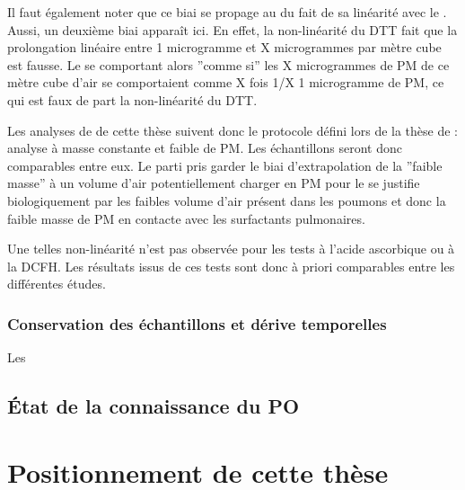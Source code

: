 Il faut également noter que ce biai se propage au \PODTTv{} du fait de sa linéarité avec le
\PODTTm. Aussi, un deuxième biai apparaît ici. En effet, la non-linéarité du DTT fait
que la prolongation linéaire entre 1 microgramme et X microgrammes par mètre cube est
fausse. Le \PODTTv{} se comportant alors ''comme si'' les X microgrammes de PM de ce mètre
cube d'air se comportaient comme X fois 1/X 1 microgramme de PM, ce qui est faux de part
la non-linéarité du DTT.

Les analyses de \PODTT{} de cette thèse suivent donc le protocole défini lors de la thèse
de \textcite{calasPollution2017} : analyse à masse constante et faible de PM. Les
échantillons seront donc comparables entre eux. Le parti pris garder le biai
d'extrapolation de la ''faible masse'' à un volume d'air potentiellement charger en PM
pour le \PODTTv{} se justifie biologiquement par les faibles volume d'air présent dans les
poumons et donc la faible masse de PM en contacte avec les surfactants pulmonaires.

Une telles non-linéarité n'est pas observée pour les tests à l'acide ascorbique ou à la
DCFH.
Les résultats issus de ces tests sont donc à priori comparables entre les différentes
études.

\subsubsection{Conservation des échantillons et dérive temporelles}%
\label{ssub:conservation_des_échantillons_et_dérive_temporelles}

Les 

\subsection{État de la connaissance du PO}%
\label{sub:etat_de_la_connaissance_du_po}



\printbibliography[segment=2,heading=subbibliography]

\section{Positionnement de cette thèse}%
\label{sec:positionnement_de_cette_thèse}


